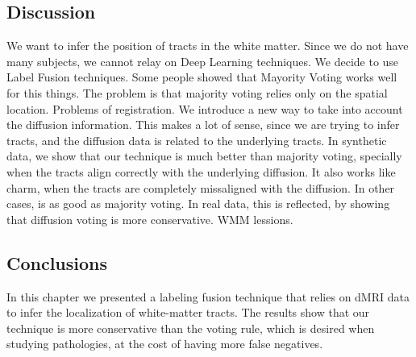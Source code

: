 
\subsection{Discussion}
We want to infer the position of tracts in the white matter.
Since we do not have many subjects, we cannot relay on Deep Learning techniques.
We decide to use Label Fusion techniques.
Some people showed that Mayority Voting works well for this things.
The problem is that majority voting relies only on the spatial location.
Problems of registration.
We introduce a new way to take into account the diffusion information.
This makes a lot of sense, since we are trying to infer tracts, and the 
diffusion data is related to the underlying tracts.
In synthetic data, we show that our technique is much better than
majority voting, specially when the tracts align correctly with the
underlying diffusion. It also works like charm, when the tracts are completely
missaligned with the diffusion. In other cases, is as good as majority voting.
In real data, this is reflected, by showing that diffusion voting is more
conservative. WMM lessions.

\subsection{Conclusions}
In this chapter we presented a labeling fusion technique that relies on dMRI
data to infer the localization of white-matter tracts. The results show that
our technique is more conservative than the voting rule, which is desired when
studying pathologies, at the cost of having more false negatives.


